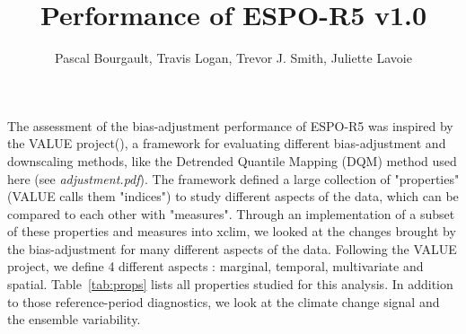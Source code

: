 \documentclass[letterpaper,10pt]{article}
\begin{document}
\title{Performance of ESPO-R5 v1.0}
\author{Pascal Bourgault, Travis Logan, Trevor J. Smith, Juliette Lavoie}
\maketitle

The assessment of the bias-adjustment performance of ESPO-R5 was inspired by the VALUE project(\cite{Maraun2015}), a framework for evaluating different bias-adjustment and downscaling methods, like the Detrended Quantile Mapping (DQM) method used here (see \emph{adjustment.pdf}). The framework defined a large collection of "properties" (VALUE calls them "indices") to study different aspects of the data, which can be compared to each other with "measures". Through an implementation of a subset of these properties and measures into xclim, we looked at the changes brought by the bias-adjustment for many different aspects of the data. Following the VALUE project, we define 4 different aspects : marginal, temporal, multivariate and spatial. Table~\ref{tab:props} lists all properties studied for this analysis. In addition to those reference-period diagnostics, we look at the climate change signal and the ensemble variability. 
\end{document}
